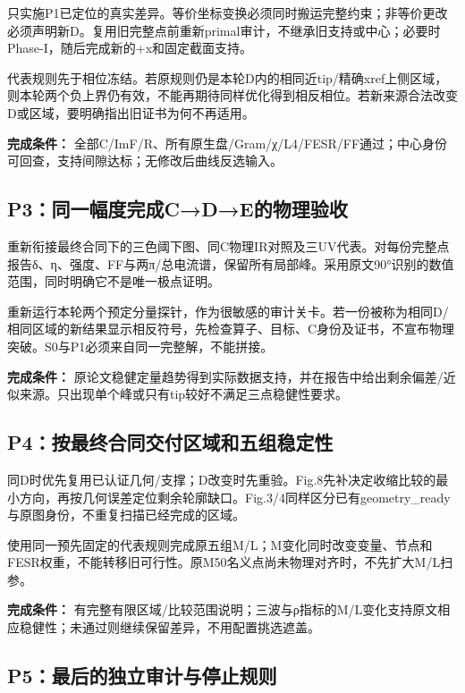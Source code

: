 \documentclass[
  10pt,
  a4paper,
]{article}
\begin{document}
只实施P1已定位的真实差异。等价坐标变换必须同时搬运完整约束；非等价更改必须声明新D。复用旧完整点前重新primal审计，不继承旧支持或中心；必要时Phase-I，随后完成新的+x和固定截面支持。

代表规则先于相位冻结。若原规则仍是本轮D内的相同近tip/精确xref上侧区域，则本轮两个负上界仍有效，不能再期待同样优化得到相反相位。若新来源合法改变D或区域，要明确指出旧证书为何不再适用。

\textbf{完成条件：}
全部C/ImF/R、所有原生盘/Gram/χ/L4/FESR/FF通过；中心身份可回查，支持间隙达标；无修改后曲线反选输入。

\subsection{P3：同一幅度完成C→D→E的物理验收}\label{p3ux540cux4e00ux5e45ux5ea6ux5b8cux6210cdeux7684ux7269ux7406ux9a8cux6536}

重新衔接最终合同下的三色阈下图、同C物理IR对照及三UV代表。对每份完整点报告δ、η、强度、FF与两π/总电流谱，保留所有局部峰。采用原文90°识别的数值范围，同时明确它不是唯一极点证明。

重新运行本轮两个预定分量探针，作为很敏感的审计关卡。若一份被称为相同D/相同区域的新结果显示相反符号，先检查算子、目标、C身份及证书，不宣布物理突破。S0与P1必须来自同一完整解，不能拼接。

\textbf{完成条件：}
原论文稳健定量趋势得到实际数据支持，并在报告中给出剩余偏差/近似来源。只出现单个峰或只有tip较好不满足三点稳健性要求。

\subsection{P4：按最终合同交付区域和五组稳定性}\label{p4ux6309ux6700ux7ec8ux5408ux540cux4ea4ux4ed8ux533aux57dfux548cux4e94ux7ec4ux7a33ux5b9aux6027}

同D时优先复用已认证几何/支撑；D改变时先重验。Fig.8先补决定收缩比较的最小方向，再按几何误差定位剩余轮廓缺口。Fig.3/4同样区分已有geometry\_ready与原图身份，不重复扫描已经完成的区域。

使用同一预先固定的代表规则完成原五组M/L；M变化同时改变变量、节点和FESR权重，不能转移旧可行性。原M50名义点尚未物理对齐时，不先扩大M/L扫参。

\textbf{完成条件：}
有完整有限区域/比较范围说明；三波与ρ指标的M/L变化支持原文相应稳健性；未通过则继续保留差异，不用配置挑选遮盖。

\subsection{P5：最后的独立审计与停止规则}\label{p5ux6700ux540eux7684ux72ecux7acbux5ba1ux8ba1ux4e0eux505cux6b62ux89c4ux5219}
\end{document}
